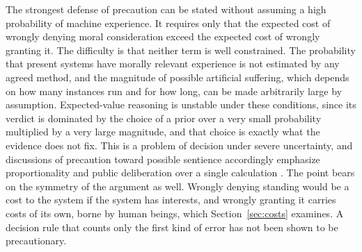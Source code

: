 \documentclass[12pt]{article}
\theoremstyle{definition}
\begin{document}
The strongest defense of precaution can be stated without assuming a high probability of machine experience. It requires only that the expected cost of wrongly denying moral consideration exceed the expected cost of wrongly granting it. The difficulty is that neither term is well constrained. The probability that present systems have morally relevant experience is not estimated by any agreed method, and the magnitude of possible artificial suffering, which depends on how many instances run and for how long, can be made arbitrarily large by assumption. Expected-value reasoning is unstable under these conditions, since its verdict is dominated by the choice of a prior over a very small probability multiplied by a very large magnitude, and that choice is exactly what the evidence does not fix. This is a problem of decision under severe uncertainty, and discussions of precaution toward possible sentience accordingly emphasize proportionality and public deliberation over a single calculation \cite{birch2024}. The point bears on the symmetry of the argument as well. Wrongly denying standing would be a cost to the system if the system has interests, and wrongly granting it carries costs of its own, borne by human beings, which Section~\ref{sec:costs} examines. A decision rule that counts only the first kind of error has not been shown to be precautionary.
\end{document}
